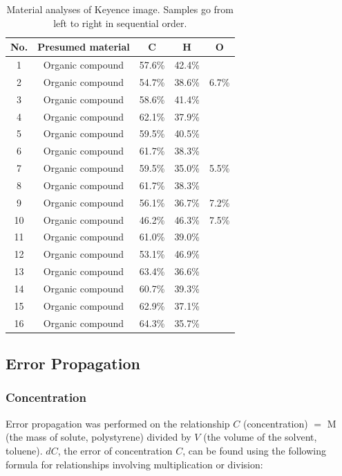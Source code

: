 \documentclass[twocolumn]{article}
\begin{document}
            \begin{table}
                \centering
                \caption{Material analyses of Keyence image. Samples go from left to right in sequential order.}\label{tab:key}
                \begin{tabular}{@{}ccccc@{}}
                    \toprule
                    No. & Presumed material & C & H & O \\ \midrule
                    1 & Organic compound & 57.6\% & 42.4\% &  \\
                    2 & Organic compound & 54.7\% & 38.6\% & 6.7\% \\
                    3 & Organic compound & 58.6\% & 41.4\% &  \\
                    4 & Organic compound & 62.1\% & 37.9\% &  \\
                    5 & Organic compound & 59.5\% & 40.5\% &  \\
                    6 & Organic compound & 61.7\% & 38.3\% &  \\
                    7 & Organic compound & 59.5\% & 35.0\% & 5.5\% \\
                    8 & Organic compound & 61.7\% & 38.3\% &  \\
                    9 & Organic compound & 56.1\% & 36.7\% & 7.2\% \\
                    10 & Organic compound & 46.2\% & 46.3\% & 7.5\% \\
                    11 & Organic compound & 61.0\% & 39.0\% &  \\
                    12 & Organic compound & 53.1\% & 46.9\% &  \\
                    13 & Organic compound & 63.4\% & 36.6\% &  \\
                    14 & Organic compound & 60.7\% & 39.3\% &  \\
                    15 & Organic compound & 62.9\% & 37.1\% &  \\
                    16 & Organic compound & 64.3\% & 35.7\% &  \\ \bottomrule
                \end{tabular}
            \end{table}

            \subsection{Error Propagation}
                \subsubsection{Concentration}
                    Error propagation was performed on the relationship $C$ (concentration) $=$ M (the mass of solute, polystyrene) divided by $V$ (the volume of the solvent, toluene). $dC$, the error of concentration $C$, can be found using the following formula for relationships involving multiplication or division: 
                    
\end{document}

